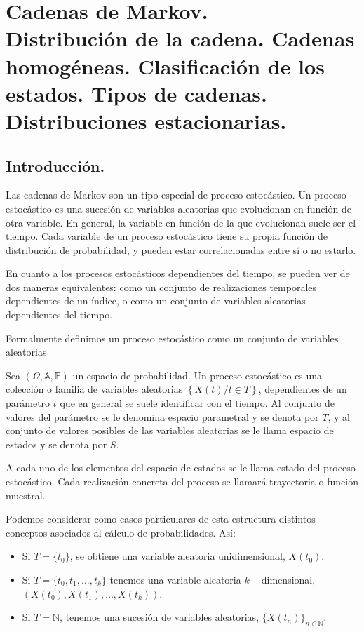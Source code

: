 \chapter[Cadenas de Markov.]{Cadenas de Markov.\\
\normalsize Distribuci\'on de la cadena. Cadenas homog\'eneas. Clasificaci\'on de los estados. Tipos de cadenas. Distribuciones estacionarias.}

\section{Introducci\'on.}
Las cadenas de Markov son un tipo especial de proceso estoc\'astico. Un proceso estoc\'astico es una sucesi\'on de variables aleatorias que evolucionan en funci\'on de otra variable. En general, la variable en funci\'on de la que evolucionan suele ser el tiempo. Cada variable de un proceso estoc\'astico tiene su propia funci\'on de distribuci\'on de probabilidad, y pueden estar correlacionadas entre s\'i o no estarlo.

En cuanto a los procesos estoc\'asticos dependientes del tiempo, se pueden ver de dos maneras equivalentes: como un conjunto de realizaciones temporales dependientes de un \'indice, o como un conjunto de variables aleatorias dependientes del tiempo.

Formalmente definimos un proceso estoc\'astico como un conjunto de variables aleatorias
\begin{definicion}
Sea $\left(\Omega,\mathbb{A}, \mathbb{P}\right) $ un espacio de probabilidad. Un proceso estoc\'astico es una colecci\'on o familia de variables aleatorias $\left\{X(t)/t\in T\right\}$, dependientes de un par\'ametro $t$ que en general se suele identificar con el tiempo. Al conjunto de valores del par\'ametro se le denomina espacio parametral y se denota por $T$, y al conjunto de valores posibles de las variables aleatorias se le llama espacio de estados y se denota por $S$. 
\end{definicion}
A cada uno de los elementos del espacio de estados se le llama estado del proceso estoc\'astico. Cada realizaci\'on concreta del proceso se llamar\'a trayectoria o funci\'on muestral.

Podemos considerar como casos particulares de esta estructura distintos conceptos asociados al c\'alculo de probabilidades. As\'i:
\begin{itemize}
\item Si $T=\{t_0\}$, se obtiene una variable aleatoria unidimensional, $X(t_0)$.
\item Si $T=\{t_0, t_1, \ldots, t_k\}$ tenemos una variable aleatoria $k-$dimensional, $(X(t_0), X(t_1), \ldots, X(t_k))$.
\item Si $T=\mathbb{N}$, tenemos una sucesi\'on de variables aleatorias, $\{X(t_n)\}_{n\in\mathbb{N}}$.
\end{itemize}

